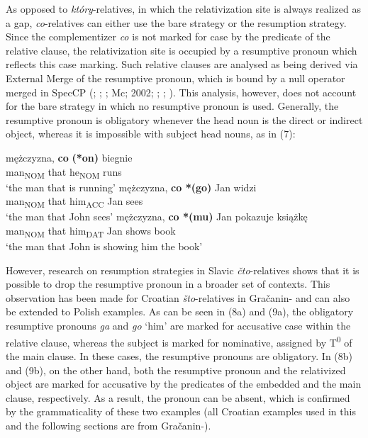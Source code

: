 \documentclass[output=paper]{langsci/langscibook}
\begin{document}
As opposed to \textit{który}{}-relatives, in which the relativization site is always realized as a gap, \textit{co}{}-relatives can either use the bare strategy or the resumption strategy. Since the complementizer \textit{co} is not marked for case by the predicate of the relative clause, the relativization site is occupied by a resumptive pronoun which reflects this case marking. Such relative clauses are analysed as being derived via External Merge of the resumptive pronoun, which is bound by a null operator merged in SpecCP (\citealt{Borer1984}; \citealt{Chomsky1977}; \citealt{Lavine2003}; Mc\citealt{Closkey1990}; 2002; \citealt{Merchant2004}; \citealt{Safir1986}; \citealt{Shlonsky1992}). This analysis, however, does not account for the bare strategy in which no resumptive pronoun is used. Generally, the resumptive pronoun is obligatory whenever the head noun is the direct or indirect object, whereas it is impossible with subject head nouns, as in (7):

\ea%
    \label{ex:leska:7}
    \ea
    \gll mężczyzna,   \textbf{co}   \textbf{(*on)} biegnie\\
         man\textsubscript{NOM}   that   he\textsubscript{NOM} runs\\
    \glt ‘the man that is running’
    \ex
    \gll mężczyzna,   \textbf{co *(go)} Jan   widzi\\
         man\textsubscript{NOM}   that him\textsubscript{ACC}   Jan   sees\\
    \glt ‘the man that John sees’
    \ex
    \gll mężczyzna,   \textbf{co *(mu)}   Jan   pokazuje   książkę\\
         man\textsubscript{NOM}   that him\textsubscript{DAT}   Jan   shows   book\\
    \glt ‘the man that John is showing him the book’
    \z
\z    

However, research on resumption strategies in Slavic \textit{čto}{}-relatives shows that it is possible to drop the resumptive pronoun in a broader set of contexts. This observation has been made for Croatian \textit{što}{}-relatives in Gračanin-\citet[29]{Yuksek2013} and can also be extended to Polish examples. As can be seen in (8a) and (9a), the obligatory resumptive pronouns \textit{ga} and \textit{go} ‘him’ are marked for accusative case within the relative clause, whereas the subject is marked for nominative, assigned by T\textsuperscript{0} of the main clause. In these cases, the resumptive pronouns are obligatory. In (8b) and (9b), on the other hand, both the resumptive pronoun and the relativized object are marked for accusative by the predicates of the embedded and the main clause, respectively. As a result, the pronoun can be absent, which is confirmed by the grammaticality of these two examples (all Croatian examples used in this and the following sections are from Gračanin-\citealt{Yuksek2013}). 
\end{document}
